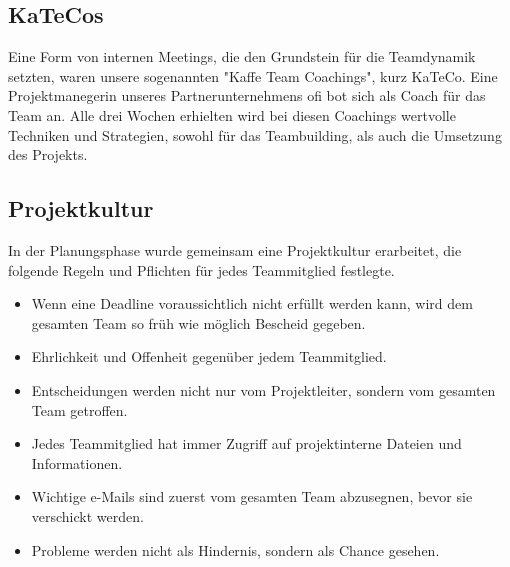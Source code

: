   \subsection{KaTeCos}
  Eine Form von internen Meetings, die den Grundstein für die Teamdynamik setzten, waren unsere
  sogenannten "Kaffe Team Coachings", kurz KaTeCo. Eine Projektmanegerin unseres Partnerunternehmens ofi
  bot sich als Coach für das Team an. Alle drei Wochen erhielten wird bei diesen Coachings wertvolle Techniken und
  Strategien, sowohl für das Teambuilding, als auch die Umsetzung des Projekts.

  \subsection{Projektkultur}
  In der Planungsphase wurde gemeinsam eine Projektkultur erarbeitet, die folgende Regeln und Pflichten
  für jedes Teammitglied festlegte.
  \begin{itemize}
    \item Wenn eine Deadline voraussichtlich nicht erfüllt werden kann, wird dem gesamten Team so früh wie möglich Bescheid gegeben.
    \item Ehrlichkeit und Offenheit gegenüber jedem Teammitglied.
    \item Entscheidungen werden nicht nur vom Projektleiter, sondern vom gesamten Team getroffen.
    \item Jedes Teammitglied hat immer Zugriff auf projektinterne Dateien und Informationen.
    \item Wichtige e-Mails sind zuerst vom gesamten Team abzusegnen, bevor sie verschickt werden.
    \item Probleme werden nicht als Hindernis, sondern als Chance gesehen.
  \end{itemize}
